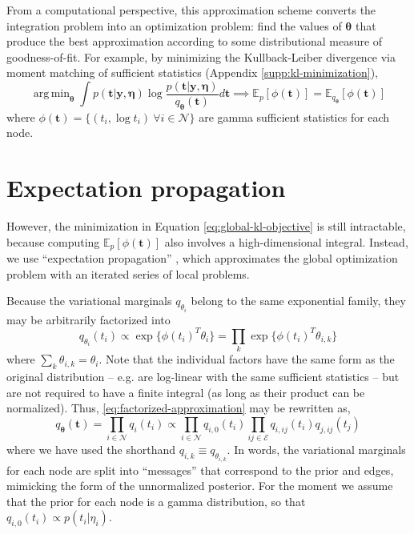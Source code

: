 \documentclass{article}
\DeclareMathOperator*{\argmin}{arg\,min}
\begin{document}
From a computational perspective, this approximation scheme converts the integration problem into an optimization problem: 
find the values of $\bm \theta$ that produce the best approximation according to some distributional measure of goodness-of-fit. 
For example, by minimizing the Kullback-Leiber divergence via moment matching of sufficient statistics (Appendix \ref{supp:kl-minimization}),
\begin{equation}
\label{eq:global-kl-objective}
\argmin_{\bm \theta} \int p(\bm t | \bm y , \bm \eta) \log \frac{p(\bm t | \bm y , \bm \eta)}{q_{\bm \theta}(\bm t)} d\bm t \implies \mathbb{E}_p[\phi(\bm t)] = \mathbb{E}_{q_{\bm \theta}}[\phi(\bm t)]
\end{equation}
where $\phi(\bm t) = \{(t_i, \log t_i)~\forall i \in \mathcal{N}\}$ are gamma sufficient statistics for each node.


\section{Expectation propagation}
\label{sec:exp-prop}

However, the minimization in Equation \ref{eq:global-kl-objective} is still intractable, 
because computing $\mathbb{E}_p[\phi(\bm t)]$ also involves a high-dimensional integral. 
Instead, we use ``expectation propagation'' \cite{minka2002expectation}, 
which approximates the global optimization problem with an iterated series of local problems.

Because the variational marginals $q_{\theta_i}$ belong to the same exponential family, 
they may be arbitrarily factorized into
\[
q_{\theta_i}(t_i) \propto \exp\{ \phi(t_i)^T \theta_i \} = \prod_k \exp\{\phi(t_i)^T \theta_{i,k}  \}    
\]
where $\sum_k \theta_{i,k} = \theta_i$. 
Note that the individual factors have the same form as the original distribution -- 
e.g. are log-linear with the same sufficient statistics -- 
but are not required to have a finite integral (as long as their product can be normalized). 
Thus, \ref{eq:factorized-approximation} may be rewritten as,
\[
q_{\bm \theta}(\bm t) = \prod_{i \in \mathcal{N}} q_i(t_i) \propto \prod_{i \in \mathcal{N}} q_{i,0}(t_i) \prod_{ij \in \mathcal{E}} q_{i,ij}(t_i) q_{j,ij}(t_j)
\]
where we have used the shorthand $q_{i,k} \equiv q_{\theta_{i,k}}$. 
In words, the variational marginals for each node are split into ``messages'' that correspond to the prior and edges, 
mimicking the form of the unnormalized posterior. 
For the moment we assume that the prior for each node is a gamma distribution, 
so that $q_{i,0}(t_i) \propto p(t_i | \eta_i)$. 
\end{document}
